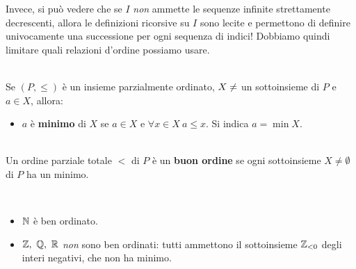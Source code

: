 Invece, si può vedere che se $I$ \textit{non} ammette le sequenze infinite strettamente decrescenti, allora le definizioni ricorsive su $I$ sono lecite e permettono di definire univocamente una successione per ogni sequenza di indici! Dobbiamo quindi limitare quali relazioni d'ordine possiamo usare.
\begin{define}[Minimo.]~{}\\
	Se $\left(P,\leq\right)$ è un insieme parzialmente ordinato, $X\neq\empty$ un sottoinsieme di $P$ e $a\in X$, allora:
	\begin{itemize}
		\item $a$ è \textbf{minimo} di $X$ se $a\in X$ e $\forall x\in X\ a\leq x$. Si indica $a=\min X$.
	\end{itemize}
\end{define}
\begin{define}~{}\\
	Un ordine parziale totale $<$ di $P$ è un \textbf{buon ordine} se ogni sottoinsieme $X\neq \emptyset$ di $P$ ha un minimo.
\end{define}
\begin{examples}~{}
	\begin{itemize}
		\item $\mathbb{N}$ è ben ordinato.
		\item $\integerset,\ \rationalset,\ \realset$ \textit{non} sono ben ordinati: tutti ammettono il sottoinsieme $\mathbb{Z}_{<0}$ degli interi negativi, che non ha minimo.
	\end{itemize}
\end{examples}
